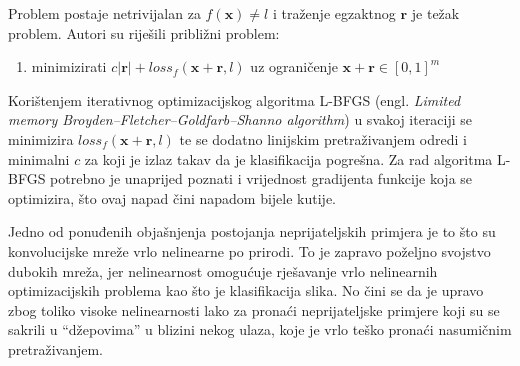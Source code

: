 \documentclass[utf8, diplomski]{fer}
\begin{document}
Problem postaje netrivijalan za $f(\boldsymbol{x}) \neq l$ i traženje egzaktnog $\boldsymbol{r}$ je težak problem. Autori su riješili približni problem:
\begin{enumerate}[noitemsep, label=\textbullet]
  \item minimizirati $c|\boldsymbol{r}| + loss_{f}(\boldsymbol{x} + \boldsymbol{r}, l)$ uz ograničenje $\boldsymbol{x} + \boldsymbol{r} \in [0, 1]^{m}$
\end{enumerate}
Korištenjem iterativnog optimizacijskog algoritma L-BFGS (engl. \textit{Limited memory Broyden–Fletcher–Goldfarb–Shanno algorithm}) u svakoj iteraciji se minimizira $loss_{f}(\boldsymbol{x} + \boldsymbol{r}, l)$ te se dodatno linijskim pretraživanjem odredi i minimalni $c$ za koji je izlaz takav da je klasifikacija pogrešna. Za rad algoritma L-BFGS potrebno je unaprijed poznati i vrijednost gradijenta funkcije koja se optimizira, što ovaj napad čini napadom bijele kutije. \par
Jedno od ponuđenih objašnjenja postojanja neprijateljskih primjera je to što su konvolucijske mreže vrlo nelinearne po prirodi. To je zapravo poželjno svojstvo dubokih mreža, jer nelinearnost omogućuje rješavanje vrlo nelinearnih optimizacijskih problema kao što je klasifikacija slika. No čini se da je upravo zbog toliko visoke nelinearnosti lako za pronaći neprijateljske primjere koji su se sakrili u ``džepovima'' u blizini nekog ulaza, koje je vrlo teško pronaći nasumičnim pretraživanjem. 
\end{document}
